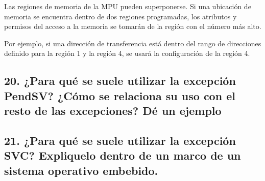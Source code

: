 \documentclass[10pt,a4paper,twoside,spanish]{article}	%
\begin{document}
Las regiones de memoria de la MPU pueden superponerse. Si una ubicación de memoria se encuentra dentro de dos regiones programadas, los atributos y permisos del acceso a la memoria se tomarán de la región con el número más alto.

Por ejemplo, si una dirección de transferencia está dentro del rango de direcciones definido para la región 1 y la región 4, se usará la configuración de la región 4.


\subsection*{20. ¿Para qué se suele utilizar la excepción PendSV? ¿Cómo se relaciona su uso con el resto de las excepciones? Dé un ejemplo}

\subsection*{21. ¿Para qué se suele utilizar la excepción SVC? Expliquelo dentro de un marco de un sistema operativo embebido.}
\end{document}
